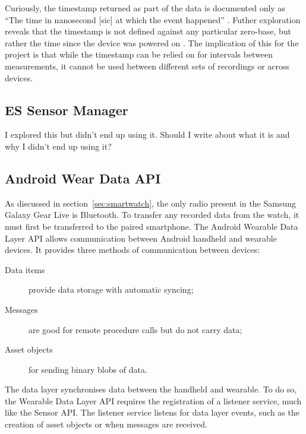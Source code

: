       Curiously, the timestamp returned as part of the data is documented only as ``The time in nanosecond [sic] at which the event happened'' \cite{androidsensoreventapi}. Futher exploration reveals that the timestamp is not defined against any particular zero-base, but rather the time since the device was powered on \cite{androidissuedocumentationbug, androidissuehardwarebug}. The implication of this for the project is that while the timestamp can be relied on for intervals between measurements, it cannot be used between different sets of recordings or across devices.
      
      
    \subsection{ES Sensor Manager}
      I explored this but didn't end up using it. Should I write about what it is and why I didn't
      end up using it?

    \subsection{Android Wear Data API}
      \label{sec:prep-data-api}
      As discussed in section~\ref{sec:smartwatch}, the only radio present in the Samsung Galaxy 
      Gear Live is Bluetooth. To transfer any recorded data from the watch, it must first be transferred to the paired smartphone. 
      The Android Wearable Data Layer API allows communication between Android handheld and wearable
      devices. It provides three methods of communication between devices:
      \begin{description}
        \item[Data items] provide data storage with automatic syncing;
        \item[Messages] are good for remote procedure calls but do not carry data;
        \item[Asset objects] for sending binary blobs of data.
      \end{description}
      
      The data layer synchronises data between the handheld and wearable. To do so, the Wearable Data Layer API requires the registration of a listener service, much like the Sensor API. The listener service listens for data layer events, such as the creation of asset objects or when messages are received.      
      
